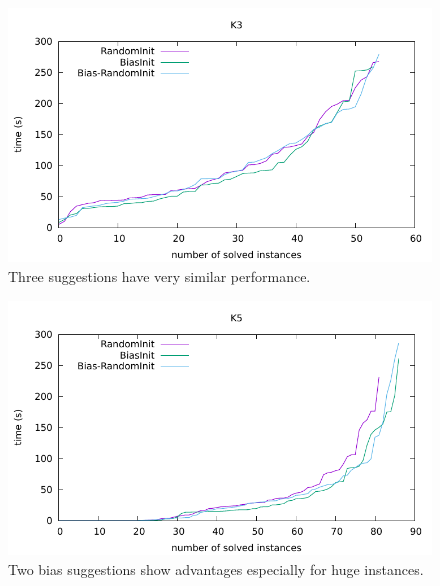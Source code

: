 \documentclass[12pt,a4paper,twoside]{scrartcl}
\numberwithin{equation}{section}
\begin{document}
\begin{figure}[H]
\begin{center}
  \includegraphics[scale = 1]{DATA/K3/e1.pdf}
  \end{center}
  \caption{Three suggestions have very similar performance.}
  \label{Experiment 1 k3 cactus plot}
  \end{figure}
  \begin{figure}[H]
\begin{center}
  \includegraphics[scale = 1]{DATA/K5/e1.pdf}
  \end{center}
  \caption{Two bias suggestions show advantages especially for huge instances.}
  \label{Experiment 1 k5 cactus plot}
  \end{figure}
\end{document}
